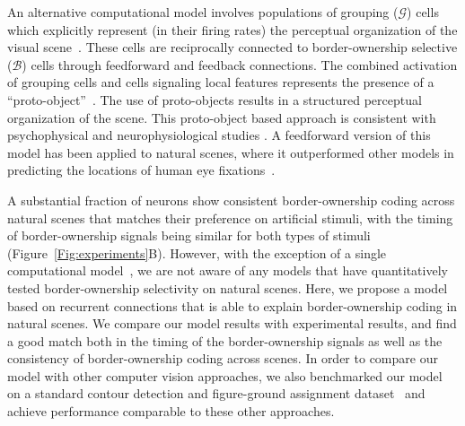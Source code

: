 An alternative computational model involves populations of grouping
($\mathcal{G}$) cells which explicitly represent (in their firing rates) the perceptual organization of the visual scene~\citep{Craft_etal07,Mihalas_etal11b}. These cells are reciprocally connected to border-ownership selective ($\mathcal{B}$) cells through feedforward and feedback connections. The combined activation of grouping cells and cells signaling local features represents the presence of a ``proto-object''~\citep[we borrow this term from the perception literature;][]{Rensink00a}. The use of proto-objects results in a structured perceptual organization of the scene. This proto-object based approach is consistent with psychophysical and neurophysiological studies
\citep[\eg][]{Duncan84,Egly_etal94,Scholl01,Kimchi_etal07,Qiu_etal07,Ho_Yeh09,Poort_etal12}. A feedforward version of this model has been applied to natural scenes, where it outperformed other models in predicting the locations of human eye fixations~\citep{Russell_etal14}.

A substantial fraction of neurons show consistent border-ownership coding across natural scenes that matches their preference on artificial stimuli, with the timing of border-ownership signals being similar for both types of stimuli (Figure~\ref{Fig:experiments}B). However, with the exception of a single computational model~\citep{Sakai_etal12}, we are not aware of any models that have quantitatively tested border-ownership selectivity on natural scenes. Here, we propose a model based on recurrent connections that is able to explain border-ownership coding in natural scenes. We compare our model results with experimental results, and find a good match both in the timing of the border-ownership signals as well as the consistency of border-ownership coding across scenes. In order to compare our model with other computer vision approaches, we also benchmarked our model on a standard contour detection and figure-ground assignment dataset~\citep{Martin_etal01} and achieve performance comparable to these other approaches.

